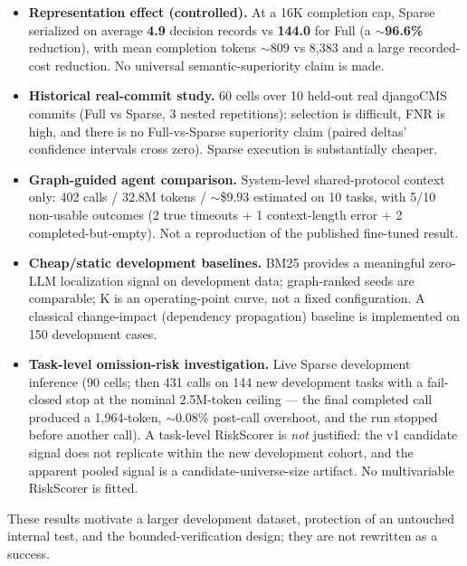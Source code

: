 \documentclass[11pt,a4paper]{article}
\begin{document}
\begin{itemize}
  \item \textbf{Representation effect (controlled).} At a 16K completion cap,
        Sparse serialized on average \textbf{4.9} decision records vs
        \textbf{144.0} for Full (a $\sim$\textbf{96.6\%} reduction), with mean
        completion tokens $\sim$809 vs 8,383 and a large recorded-cost
        reduction. No universal semantic-superiority claim is made.
  \item \textbf{Historical real-commit study.} 60 cells over 10 held-out real
        djangoCMS commits (Full vs Sparse, 3 nested repetitions): selection is
        difficult, FNR is high, and there is no Full-vs-Sparse superiority
        claim (paired deltas' confidence intervals cross zero). Sparse
        execution is substantially cheaper.
  \item \textbf{Graph-guided agent comparison.} System-level shared-protocol
        context only: 402 calls / 32.8M tokens / $\sim$\$9.93 estimated on 10
        tasks, with 5/10 non-usable outcomes (2 true timeouts + 1
        context-length error + 2 completed-but-empty). Not a reproduction of
        the published fine-tuned result.
  \item \textbf{Cheap/static development baselines.} BM25 provides a
        meaningful zero-LLM localization signal on development data;
        graph-ranked seeds are comparable; K is an operating-point curve, not
        a fixed configuration. A classical change-impact (dependency
        propagation) baseline is implemented on 150 development cases.
  \item \textbf{Task-level omission-risk investigation.} Live Sparse
        development inference (90 cells; then 431 calls on 144 new development
        tasks with a fail-closed stop at the nominal 2.5M-token ceiling --- the
        final completed call produced a 1,964-token, $\sim$0.08\% post-call
        overshoot, and the run stopped before another call). A task-level
        RiskScorer is \emph{not} justified: the v1 candidate signal does not
        replicate within the new development cohort, and the apparent pooled
        signal is a candidate-universe-size artifact. No multivariable
        RiskScorer is fitted.
\end{itemize}

These results motivate a larger development dataset, protection of an untouched
internal test, and the bounded-verification design; they are not rewritten as a
success.
\end{document}
